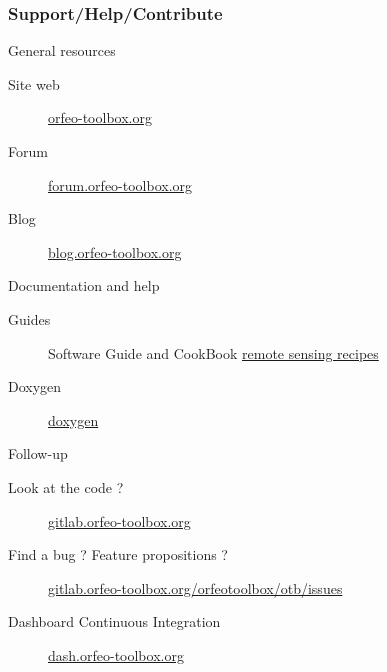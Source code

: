 \begin{frame}
  \frametitle{Support/Help/Contribute}
  \vspace{-0.2cm}
  \begin{block}{General resources}
    \vspace{-0.2cm}
    \begin{description}
    \item[Site web] \href{https://www.orfeo-toolbox.org}{orfeo-toolbox.org}
    \item[Forum] \href{https://forum.orfeo-toolbox.org}{forum.orfeo-toolbox.org}
    \item[Blog] \href{http://blog.orfeo-toolbox.org}{blog.orfeo-toolbox.org}
    \end{description}
  \end{block}
  \vspace{-0.2cm}
  \begin{block}{Documentation and help}
    \vspace{-0.2cm}
    \begin{description}
    \item[Guides] Software Guide and CookBook  \href{https://www.orfeo-toolbox.org/CookBook}{remote sensing recipes}
    \item[Doxygen] \href{http://www.orfeo-toolbox.org/doxygen}{doxygen}
    \end{description}
  \end{block}
  \vspace{-0.2cm}
  \begin{block}{Follow-up}
    \vspace{-0.2cm}
    \begin{description}
    \item[Look at the code ?] \href{https://gitlab.orfeo-toolbox.org/orfeotoolbox/otb}{gitlab.orfeo-toolbox.org}
    \item[Find a bug ? Feature propositions ?] \href{https://gitlab.orfeo-toolbox.org/orfeotoolbox/otb/issues}{gitlab.orfeo-toolbox.org/orfeotoolbox/otb/issues}
    \item[Dashboard  Continuous Integration] \href{http://dash.orfeo-toolbox.org}{dash.orfeo-toolbox.org}
    \end{description}
  \end{block}
\end{frame}
